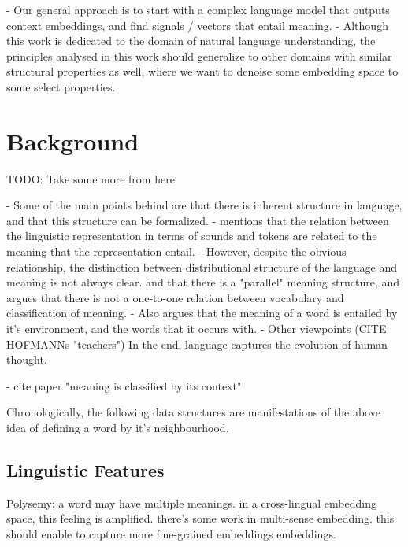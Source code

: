 \documentclass[a4paper,12pt,twoside,openright]{report}
\begin{document}
- Our general approach is to start with a complex language model that outputs context embeddings, and find signals / vectors that entail meaning.
- Although this work is dedicated to the domain of natural language understanding, the principles analysed in this work should generalize to other domains with similar structural properties as well, where we want to denoise some embedding space to some select properties.


\chapter{Background} 

TODO: Take some more from here

- Some of the main points behind \cite{harris54} are that there is inherent structure in language, and that this structure can be formalized.
- \cite{harris54} mentions that the relation between the linguistic representation in terms of sounds and tokens are related to the meaning that the representation entail.
- However, despite the obvious relationship, the distinction between distributional structure of the language and meaning is not always clear. and that there is a "parallel" meaning structure, and argues that there is not a one-to-one relation between vocabulary and classification of meaning. 
- Also argues that the meaning of a word is entailed by it's environment, and the words that it occurs with.
- Other viewpoints (CITE HOFMANNs "teachers") In the end, language captures the evolution of human thought.

- cite paper "meaning is classified by its context"

Chronologically, the following data structures are manifestations of the above idea of defining a word by it's neighbourhood.

\section{Linguistic Features}
Polysemy:
a word may have multiple meanings.
in a cross-lingual embedding space, this feeling is amplified.
there's some work in multi-sense embedding.
this should enable to capture more fine-grained embeddings embeddings.
\end{document}
